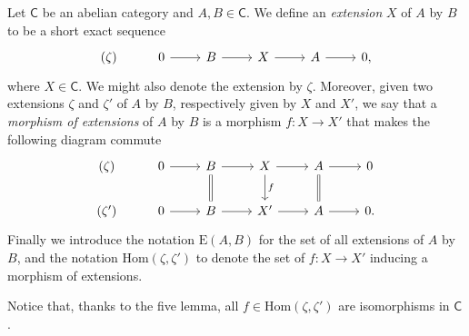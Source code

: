 \begin{defn}[Extension]
	Let $\mathsf{C}$ be an abelian category and $A,B \in \mathsf{C}$.
	We define an {\em extension} $X$ of $A$ by $B$ to be a short exact sequence
	\begin{equation*}
	\begin{tikzcd}
		(\zeta) &
		0 \arrow[r, "", rightarrow] &
		B \arrow[r, "", rightarrow] &
		X \arrow[r, "", rightarrow] &
		A \arrow[r, "", rightarrow] &
		0
	,\end{tikzcd}
	\end{equation*}
	where $X \in \mathsf{C}$.
	We might also denote the extension by $\zeta$.
	Moreover, given two extensions $\zeta$ and $\zeta'$ of $A$ by $B$,
	respectively given by $X$ and $X'$, we say that a {\em morphism of extensions} of $A$ by $B$
	is a morphism $f\colon X \to X'$ that makes the following diagram commute
	\begin{equation*}
	\begin{tikzcd}
		(\zeta) &
		0 \arrow[r, "", rightarrow] &
		B \arrow[r, "", rightarrow] 
		\arrow[d, "", equals] &
		X \arrow[r, "", rightarrow] 
		\arrow[d, "f", rightarrow] &
		A \arrow[r, "", rightarrow] 
		\arrow[d, "", equals] &
		0\\
		(\zeta') &
		0 \arrow[r, "", rightarrow] &
		B \arrow[r, "", rightarrow] &
		X' \arrow[r, "", rightarrow] &
		A \arrow[r, "", rightarrow] &
		0
	.\end{tikzcd}
	\end{equation*}
	Finally we introduce the notation $\mathrm{E}(A,B)$ for the set of all extensions
	of $A$ by $B$, and the notation $\mathrm{Hom} \left( \zeta, \zeta' \right)$
	to denote the set of $f\colon X \to X'$ inducing a morphism of extensions.
\end{defn}


\begin{rem}[]
	Notice that, thanks to the five lemma, all $f \in \mathrm{Hom} 
	\left( \zeta, \zeta' \right)$ are isomorphisms in $\mathsf{C}$.
\end{rem}


